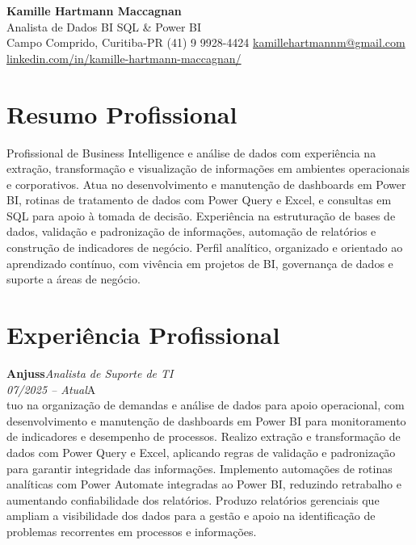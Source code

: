 \documentclass[11pt,a4paper]{article}
\newcommand{\cvrole}[4]{%
  \vspace{4pt}%
  {\bfseries\color{accentcolor}#1}\hfill{\itshape #2}\\[-2pt]%
  {\itshape #3}\hfill #4\\[6pt]%
}
\begin{document}
\begin{center}
  {\fontsize{20}{24}\selectfont\bfseries Kamille Hartmann Maccagnan}\\[8pt]
  {\large Analista de Dados \textbar{} BI \textbar{} SQL \& Power BI}\\[10pt]
  Campo Comprido, Curitiba-PR \enspace\textbullet\enspace (41) 9 9928-4424 \enspace\textbullet\enspace
  \href{mailto:kamillehartmannm@gmail.com}{kamillehartmannm@gmail.com}\\[3pt]
  \href{https://linkedin.com/in/kamille-hartmann-maccagnan/}{linkedin.com/in/kamille-hartmann-maccagnan/}
\end{center}

\vspace{6pt}

\section{Resumo Profissional}

Profissional de Business Intelligence e análise de dados com experiência na extração, transformação e visualização de informações em ambientes operacionais e corporativos. Atua no desenvolvimento e manutenção de dashboards em Power BI, rotinas de tratamento de dados com Power Query e Excel, e consultas em SQL para apoio à tomada de decisão. Experiência na estruturação de bases de dados, validação e padronização de informações, automação de relatórios e construção de indicadores de negócio. Perfil analítico, organizado e orientado ao aprendizado contínuo, com vivência em projetos de BI, governança de dados e suporte a áreas de negócio.

\section{Experiência Profissional}

\cvrole{Anjuss}{Analista de Suporte de TI}{07/2025 -- Atual}

Atuo na organização de demandas e análise de dados para apoio operacional, com desenvolvimento e manutenção de dashboards em Power BI para monitoramento de indicadores e desempenho de processos. Realizo extração e transformação de dados com Power Query e Excel, aplicando regras de validação e padronização para garantir integridade das informações. Implemento automações de rotinas analíticas com Power Automate integradas ao Power BI, reduzindo retrabalho e aumentando confiabilidade dos relatórios. Produzo relatórios gerenciais que ampliam a visibilidade dos dados para a gestão e apoio na identificação de problemas recorrentes em processos e informações.
\end{document}
